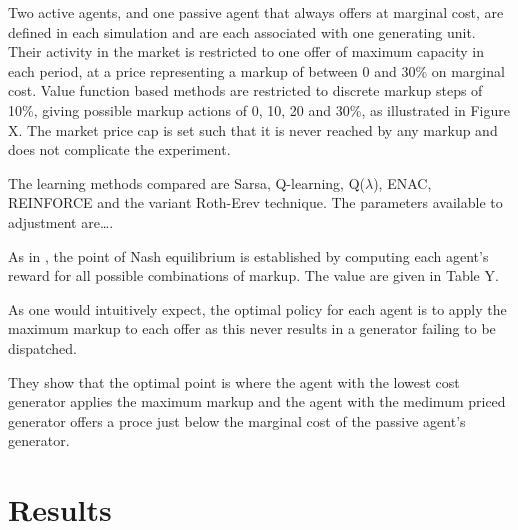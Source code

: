 Two active agents, and one passive agent that always offers at marginal cost,
are defined in each simulation and are each associated with one generating
unit. Their activity in the market is restricted to one offer of maximum
capacity in each period, at a price representing a markup of between 0 and 30\%
on marginal cost.  Value function based methods are restricted to discrete markup steps of
10\%, giving possible markup actions of 0, 10, 20 and 30\%, as illustrated in
Figure X.  The market price cap is set such that it is never reached by any
markup and does not complicate the experiment.

The learning methods compared are Sarsa, Q-learning, Q($\lambda$), ENAC,
REINFORCE and the variant Roth-Erev technique.  The parameters available to
adjustment are\ldots.

As in , the point of Nash equilibrium is established by
computing each agent's reward for all possible combinations of markup.  The
value are given in Table Y.

As one would intuitively expect, the optimal policy for each agent is to apply
the maximum markup to each offer as this never results in a generator failing
to be dispatched.

They show that the optimal point is where the agent with the lowest cost
generator applies the maximum markup and the agent with the medimum priced
generator offers a proce just below the marginal cost of the passive
agent's generator.


\section{Results}

